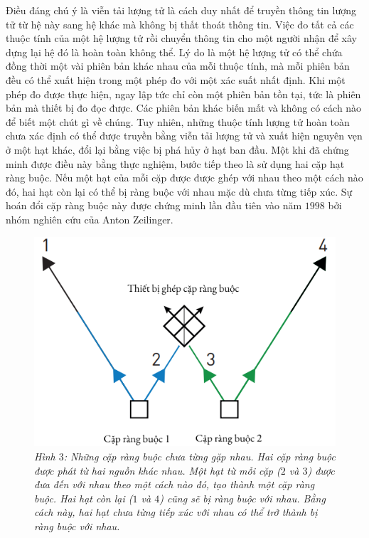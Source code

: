 \begin{multicols}{2}
	\vskip 0.1cm
	Điều đáng chú ý là viễn tải lượng tử là cách duy nhất để truyền thông tin lượng tử từ hệ này sang hệ khác mà không bị thất thoát thông tin. Việc đo tất cả các thuộc tính của một hệ lượng tử rồi chuyển thông tin cho một người nhận để xây dựng lại hệ đó là hoàn toàn không thể. Lý do là một hệ lượng tử có thể chứa đồng thời một vài phiên bản khác nhau của mỗi thuộc tính, mà mỗi phiên bản đều có thể xuất hiện trong một phép đo với một xác suất nhất định. Khi một phép đo được thực hiện, ngay lập tức chỉ còn một phiên bản tồn tại, tức là phiên bản mà thiết bị đo đọc được. Các phiên bản khác biến mất và không có cách nào để biết một chút gì về chúng. Tuy nhiên, những thuộc tính lượng tử hoàn toàn chưa xác định có thể được truyền bằng viễn tải lượng tử và xuất hiện nguyên vẹn ở một hạt khác, đổi lại bằng việc bị phá hủy ở hạt ban đầu.
	\vskip 0.1cm
	Một khi đã chứng minh được điều này bằng thực nghiệm, bước tiếp theo là sử dụng hai cặp hạt ràng buộc. Nếu một hạt của mỗi cặp được được ghép với nhau theo một cách nào đó, hai hạt còn lại có thể bị ràng buộc với nhau mặc dù chưa từng tiếp xúc. Sự hoán đổi cặp ràng buộc này được chứng minh lần đầu tiên vào năm $1998$ bởi nhóm nghiên cứu của Anton Zeilinger.
	\begin{figure}[H]
		\vspace*{-5pt}
		\centering
		\captionsetup{labelformat= empty, justification=centering}
		\includegraphics[width= 1\linewidth]{3}
		\caption{\small\textit{\color{timhieukhoahoc}Hình $3$: Những cặp ràng buộc chưa từng gặp nhau. Hai cặp ràng buộc được phát từ hai nguồn khác nhau. Một hạt từ mỗi cặp ($2$ và $3$) được đưa đến với nhau theo một cách nào đó, tạo thành một cặp ràng buộc. Hai hạt còn lại ($1$ và $4$) cũng sẽ bị ràng buộc với nhau. Bằng cách này, hai hạt chưa từng tiếp xúc với nhau có thể trở thành bị ràng buộc với nhau.}}

\end{figure}
\end{multicols}
